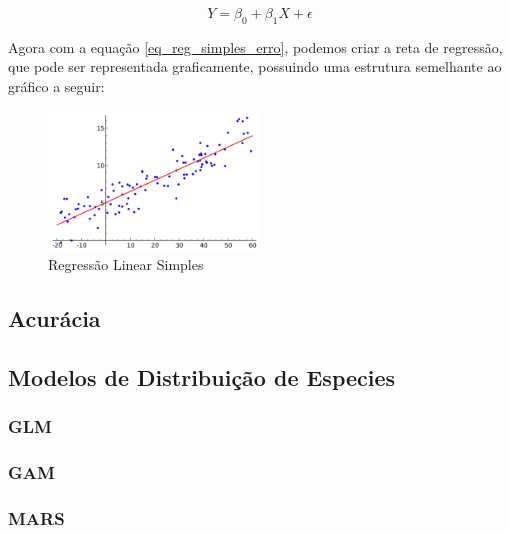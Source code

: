 \documentclass[
	12pt,				%
	openright,			%
	oneside,			%
	a4paper,			%
	english,			%
	brazil				%
	]{abntex2}
\begin{document}
\begin{equation}
	\label{eq_reg_simples_erro}
	Y = \beta_0 + \beta_1X + \epsilon
\end{equation}

Agora com a equação \ref{eq_reg_simples_erro}, podemos criar a reta de regressão, que pode ser
representada graficamente, possuindo uma estrutura semelhante ao gráfico a seguir:

\begin{figure}[htb]
    \centering
    \caption{\label{GPS}Regressão Linear Simples}
    \includegraphics[width=0.5\textwidth]{../Imgs/reg_linear_simples.png}
\end{figure}

\subsection{Acurácia}
\subsection{Modelos de Distribuição de Especies}
\subsubsection{GLM}
\subsubsection{GAM}
\subsubsection{MARS}
\end{document}

